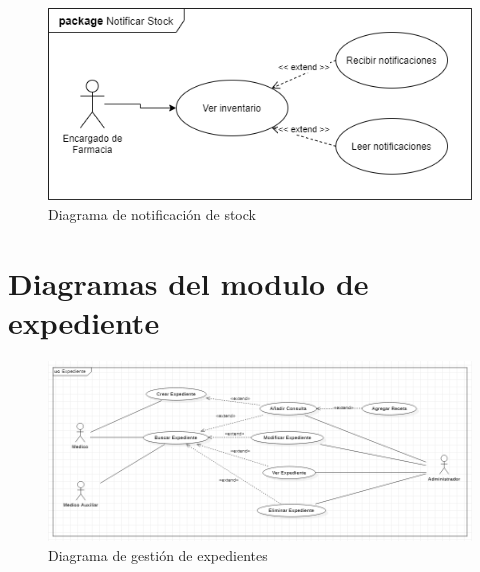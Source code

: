 \documentclass[12pt,letterpaper]{article}
\begin{document}
{\begin{figure}[H]
        \end{figure}
        \begin{figure}[H]
            \centering
            \includegraphics [scale=0.5]{notificarStock}
            \caption{Diagrama de notificación de stock}
        \end{figure}
    \section{Diagramas del modulo de expediente}
        \begin{figure}[H]
            \centering
            \includegraphics [scale=0.5]{gestionExpediente}
            \caption{Diagrama de gestión de expedientes}
        \end{figure}
			\vfill
    }
    \newpage
	\pagestyle{plain}
\end{document}
